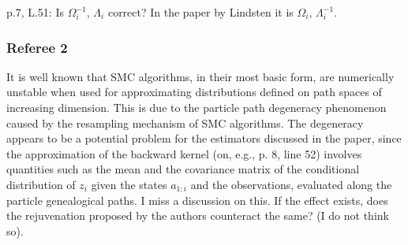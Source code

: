 \vspace{.2cm}


\vspace{.5cm}

\noindent p.7, L.51: Is $\Omega_i^{-1}$, $\Lambda_i$ correct? In the paper by Lindsten it is
$\Omega_i$, $\Lambda_i^{-1}$.

\vspace{.2cm}


\subsubsection*{Referee 2}
\noindent It is well known that SMC algorithms, in their most basic form, are numerically unstable
when used for approximating distributions defined on path spaces of increasing dimension. This is due to the particle path degeneracy phenomenon caused by the resampling mechanism of SMC algorithms. The degeneracy appears to be a potential problem for the estimators discussed in the paper, since the approximation of the
backward kernel (on, e.g., p. 8, line 52) involves quantities such as the mean and the
covariance matrix of the conditional distribution of $z_i$ given the states $a_{1:i}$ and the observations,
evaluated along the particle genealogical paths. I miss a discussion on this. If the effect exists, does the rejuvenation proposed by the authors counteract the same? (I do not think so).

